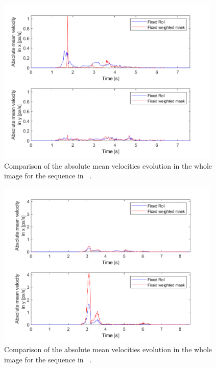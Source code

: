 \begin{figure}[H]
    \centering
    \includegraphics[width=0.95\textwidth]{resources/images/OF_comparison_set_no_slip}
    \caption{Comparison of the absolute mean velocities evolution in the whole image for the sequence in ~.}\label{fig:OF_comparison_set_no_slip}
\end{figure}

\begin{figure}[H]
    \centering
    \includegraphics[width=0.95\textwidth]{resources/images/OF_comparison_set}
    \caption{Comparison of the absolute mean velocities evolution in the whole image for the sequence in ~.}\label{fig:OF_comparison_set}
\end{figure}

